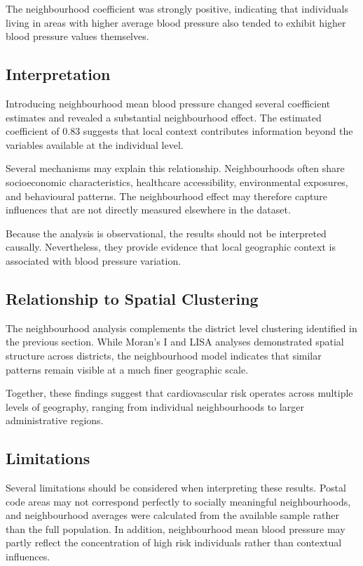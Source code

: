 \documentclass[12pt,a4paper]{article}
\begin{document}
The neighbourhood coefficient was strongly positive, indicating that individuals living in areas with higher average blood pressure also tended to exhibit higher blood pressure values themselves.

\subsection{Interpretation}

Introducing neighbourhood mean blood pressure changed several coefficient estimates and revealed a substantial neighbourhood effect. The estimated coefficient of 0.83 suggests that local context contributes information beyond the variables available at the individual level.

Several mechanisms may explain this relationship. Neighbourhoods often share socioeconomic characteristics, healthcare accessibility, environmental exposures, and behavioural patterns. The neighbourhood effect may therefore capture influences that are not directly measured elsewhere in the dataset.

Because the analysis is observational, the results should not be interpreted causally. Nevertheless, they provide evidence that local geographic context is associated with blood pressure variation.

\subsection{Relationship to Spatial Clustering}

The neighbourhood analysis complements the district level clustering identified in the previous section. While Moran's I and LISA analyses demonstrated spatial structure across districts, the neighbourhood model indicates that similar patterns remain visible at a much finer geographic scale.

Together, these findings suggest that cardiovascular risk operates across multiple levels of geography, ranging from individual neighbourhoods to larger administrative regions.

\subsection{Limitations}

Several limitations should be considered when interpreting these results. Postal code areas may not correspond perfectly to socially meaningful neighbourhoods, and neighbourhood averages were calculated from the available sample rather than the full population. In addition, neighbourhood mean blood pressure may partly reflect the concentration of high risk individuals rather than contextual influences.
\end{document}
